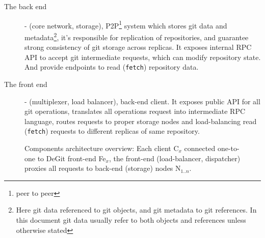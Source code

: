 \documentclass[12pt,oneside]{article}
\newcommand{\code}[1]{\texttt{#1}}
\begin{document}
\begin{description}
  \item[The back end] - (core network, storage), P2P\footnote{peer to peer} system which stores git data
    and metadata\footnote{Here git data referenced to git objects, and git metadata to git references.
    In this document git data usually refer to both objects and references unless otherwise stated},
    it's responsible for replication of repositories, and guarantee
    strong consistency of git storage across replicas. It exposes internal RPC API to accept git intermediate
    requests, which can modify repository state. And provide endpoints to read (\code{fetch}) repository data.
  \item[The front end] - (multiplexer, load balancer), back-end client. It exposes public API for all git operations,
    translates all operations request into intermediate RPC language, routes requests to proper storage
    nodes and load-balancing read (\code{fetch}) requests to different replicas of same repository.
\end{description}

\begin{figure}
  \begin{center}
  \end{center}
  \caption{
    Components architecture overview:
    Each client C$_{x}$ connected one-to-one to DeGit front-end Fe$_{x}$,
    the front-end (load-balancer, dispatcher) proxies all requests to
    back-end (storage) nodes N$_{1..n}$.
  }
  \label{fig:comp-arc-overview}
\end{figure}
\end{document}
